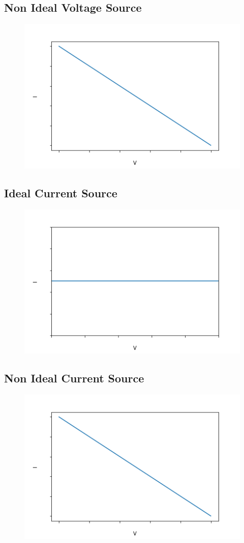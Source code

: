 \documentclass[12pt]{article}
\begin{document}
\subsection*{Non Ideal Voltage Source}
\begin{figure}[h]
\includegraphics[scale=0.5]{fig3}
\centering
\end{figure}
\FloatBarrier
\subsection*{Ideal Current Source}
\begin{figure}[h]
\includegraphics[scale=0.5]{fig2}
\centering
\end{figure}
\FloatBarrier
\subsection*{Non Ideal Current Source}
\begin{figure}[h]
\includegraphics[scale=0.5]{fig4}
\centering
\end{figure}
\FloatBarrier
\end{document}
